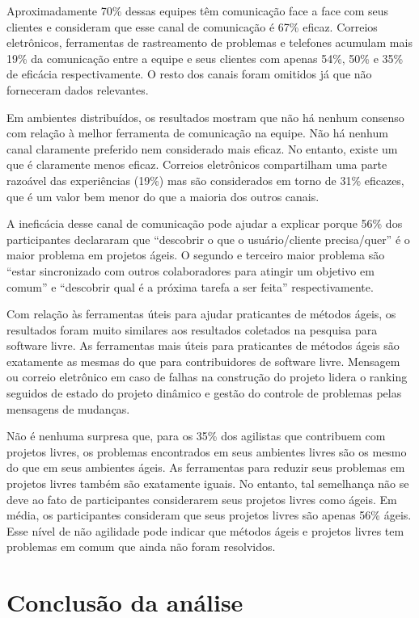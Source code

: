 Aproximadamente 70\% dessas equipes têm comunicação face a face com
seus clientes e consideram que esse canal de comunicação é 67\%
eficaz. Correios eletrônicos, ferramentas de rastreamento de problemas
e telefones acumulam mais 19\% da comunicação entre a equipe e seus
clientes com apenas 54\%, 50\% e 35\% de eficácia respectivamente. O
resto dos canais foram omitidos já que não forneceram dados
relevantes.

Em ambientes distribuídos, os resultados mostram que não há nenhum
consenso com relação à melhor ferramenta de comunicação na equipe. Não
há nenhum canal claramente preferido nem considerado mais eficaz. No
entanto, existe um que é claramente menos eficaz. Correios eletrônicos
compartilham uma parte razoável das experiências (19\%) mas são considerados
em torno de 31\% eficazes, que é um valor bem menor do que a maioria
dos outros canais.

A ineficácia desse canal de comunicação pode ajudar a explicar porque
56\% dos participantes declararam que ``descobrir o que o
usuário/cliente precisa/quer'' é o maior problema em projetos ágeis. O
segundo e terceiro maior problema são ``estar sincronizado com outros
colaboradores para atingir um objetivo em comum'' e ``descobrir qual é
a próxima tarefa a ser feita'' respectivamente.

Com relação às ferramentas úteis para ajudar praticantes de métodos
ágeis, os resultados foram muito similares aos resultados coletados na
pesquisa para software livre. As ferramentas mais úteis para
praticantes de métodos ágeis são exatamente as mesmas do que para
contribuidores de software livre. Mensagem ou correio eletrônico em
caso de falhas na construção do projeto lidera o ranking seguidos de
estado do projeto dinâmico e gestão do controle de problemas pelas
mensagens de mudanças.

Não é nenhuma surpresa que, para os 35\% dos agilistas que contribuem
com projetos livres, os problemas encontrados em seus ambientes livres
são os mesmo do que em seus ambientes ágeis. As ferramentas para
reduzir seus problemas em projetos livres também são exatamente
iguais. No entanto, tal semelhança não se deve ao fato de
participantes considerarem seus projetos livres como ágeis. Em média,
os participantes consideram que seus projetos livres são apenas 56\%
ágeis. Esse nível de não agilidade pode indicar que métodos ágeis e
projetos livres tem problemas em comum que ainda não foram resolvidos.

\section{Conclusão da análise}
\label{sec:proposta}

